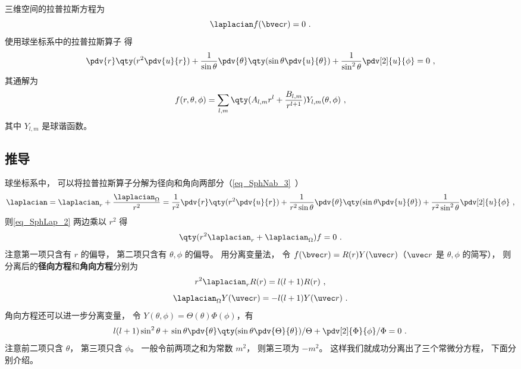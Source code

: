 

三维空间的拉普拉斯方程为
\begin{equation}\label{eq_SphLap_2}
\laplacian f(\bvec r) = 0~.
\end{equation}
使用球坐标系中的拉普拉斯算子 得
\begin{equation}
\pdv{r} \qty(r^2 \pdv{u}{r}) + \frac{1}{\sin\theta}\pdv{\theta} \qty(\sin \theta \pdv{u}{\theta}) + \frac{1}{\sin^2 \theta} \pdv[2]{u}{\phi} = 0~,
\end{equation}
其通解为
\begin{equation}\label{eq_SphLap_7}
f(r, \theta, \phi) = \sum_{l,m} \qty(A_{l,m} r^l + \frac{B_{l,m}}{r^{l+1}}) Y_{l,m} (\theta, \phi)~,
\end{equation}
其中 $Y_{l,m}$ 是球谐函数。

\subsection{推导}
球坐标系中， 可以将拉普拉斯算子分解为径向和角向两部分（\autoref{eq_SphNab_3}~）
\begin{equation}\label{eq_SphLap_5}
\laplacian = \laplacian_r + \frac{\laplacian_{\Omega}}{r^2} = \frac{1}{r^2} \pdv{r} \qty(r^2 \pdv{u}{r}) + \frac{1}{r^2\sin\theta}\pdv{\theta} \qty(\sin \theta \pdv{u}{\theta}) + \frac{1}{r^2\sin^2 \theta} \pdv[2]{u}{\phi}~,
\end{equation}
则\autoref{eq_SphLap_2} 两边乘以 $r^2$ 得
\begin{equation}
\qty(r^2\laplacian_r + \laplacian_\Omega) f = 0~.
\end{equation}
注意第一项只含有 $r$ 的偏导， 第二项只含有 $\theta,\phi$ 的偏导。 用分离变量法， 令 $f(\bvec r) = R(r) Y(\uvec r)$（$\uvec r$ 是 $\theta, \phi$ 的简写）， 则分离后的\textbf{径向方程}和\textbf{角向方程}分别为
\begin{equation}\label{eq_SphLap_4}
r^2\laplacian_r R(r) = l(l+1)R(r)~,
\end{equation}
\begin{equation}\label{eq_SphLap_1}
\laplacian_{\Omega} Y(\uvec r) = -l(l+1) Y(\uvec r)~.
\end{equation}
角向方程还可以进一步分离变量， 令 $Y(\theta,\phi) = \Theta(\theta)\Phi(\phi)$，有
\begin{equation}\label{eq_SphLap_3}
l(l+1)\sin^2 \theta + \left. \sin\theta\pdv{\theta} \qty(\sin \theta \pdv{\Theta}{\theta}) \middle/ \Theta + \pdv[2]{\Phi}{\phi} \middle/ \Phi = 0~. \right.
\end{equation}
注意前二项只含 $\theta$， 第三项只含 $\phi$。 一般令前两项之和为常数 $m^2$， 则第三项为 $-m^2$。 这样我们就成功分离出了三个常微分方程， 下面分别介绍。

